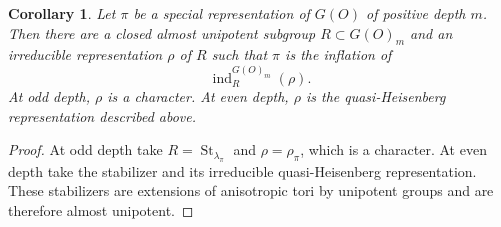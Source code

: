 \documentclass[11pt,a4paper,twoside]{amsart}
\newtheorem{corollary}[theorem]{Corollary}
\theoremstyle{definition}
\theoremstyle{remark}
\newcommand{\bl}{\lambda}
\newcommand{\ind}{\operatorname{ind}}
\newcommand{\St}{\operatorname{St}}
\begin{document}
\begin{corollary}\label{cunr}
Let $\pi$ be a special representation of $G(O)$ of positive depth $m$. Then there are a closed almost unipotent subgroup $R\subset G(O)_m$ and an irreducible representation $\rho$ of $R$ such that $\pi$ is the inflation of
$$
\ind_R^{G(O)_m}(\rho).
$$
At odd depth, $\rho$ is a character. At even depth, $\rho$ is the quasi-Heisenberg representation described above.
\end{corollary}
\begin{proof}
At odd depth take $R=\St_{\bl_\pi}$ and $\rho=\rho_\pi$, which is a character. At even depth take the stabilizer and its irreducible quasi-Heisenberg representation. These stabilizers are extensions of anisotropic tori by unipotent groups and are therefore almost unipotent.
\end{proof}
\end{document}

